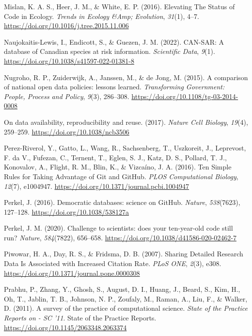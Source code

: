 \begin{CSLReferences}{1}{0}
\leavevmode{}%
Mislan, K. A. S., Heer, J. M., \& White, E. P. (2016). Elevating The Status of Code in Ecology. \emph{Trends in Ecology \&Amp; Evolution}, \emph{31}(1), 4--7. \url{https://doi.org/10.1016/j.tree.2015.11.006}

\leavevmode{}%
Naujokaitis-Lewis, I., Endicott, S., \& Guezen, J. M. (2022). CAN-SAR: A database of Canadian species at risk information. \emph{Scientific Data}, \emph{9}(1). \url{https://doi.org/10.1038/s41597-022-01381-8}

\leavevmode{}%
Nugroho, R. P., Zuiderwijk, A., Janssen, M., \& de Jong, M. (2015). A comparison of national open data policies: lessons learned. \emph{Transforming Government: People, Process and Policy}, \emph{9}(3), 286--308. \url{https://doi.org/10.1108/tg-03-2014-0008}

\leavevmode{}%
On data availability, reproducibility and reuse. (2017). \emph{Nature Cell Biology}, \emph{19}(4), 259--259. \url{https://doi.org/10.1038/ncb3506}

\leavevmode{}%
Perez-Riverol, Y., Gatto, L., Wang, R., Sachsenberg, T., Uszkoreit, J., Leprevost, F. da V., Fufezan, C., Ternent, T., Eglen, S. J., Katz, D. S., Pollard, T. J., Konovalov, A., Flight, R. M., Blin, K., \& Vizcaíno, J. A. (2016). Ten Simple Rules for Taking Advantage of Git and GitHub. \emph{PLOS Computational Biology}, \emph{12}(7), e1004947. \url{https://doi.org/10.1371/journal.pcbi.1004947}

\leavevmode{}%
Perkel, J. (2016). Democratic databases: science on GitHub. \emph{Nature}, \emph{538}(7623), 127--128. \url{https://doi.org/10.1038/538127a}

\leavevmode{}%
Perkel, J. M. (2020). Challenge to scientists: does your ten-year-old code still run? \emph{Nature}, \emph{584}(7822), 656--658. \url{https://doi.org/10.1038/d41586-020-02462-7}

\leavevmode{}%
Piwowar, H. A., Day, R. S., \& Fridsma, D. B. (2007). Sharing Detailed Research Data Is Associated with Increased Citation Rate. \emph{PLoS ONE}, \emph{2}(3), e308. \url{https://doi.org/10.1371/journal.pone.0000308}

\leavevmode{}%
Prabhu, P., Zhang, Y., Ghosh, S., August, D. I., Huang, J., Beard, S., Kim, H., Oh, T., Jablin, T. B., Johnson, N. P., Zoufaly, M., Raman, A., Liu, F., \& Walker, D. (2011). A survey of the practice of computational science. \emph{State of the Practice Reports on - SC '11}. State of the Practice Reports. \url{https://doi.org/10.1145/2063348.2063374}


\end{CSLReferences}
